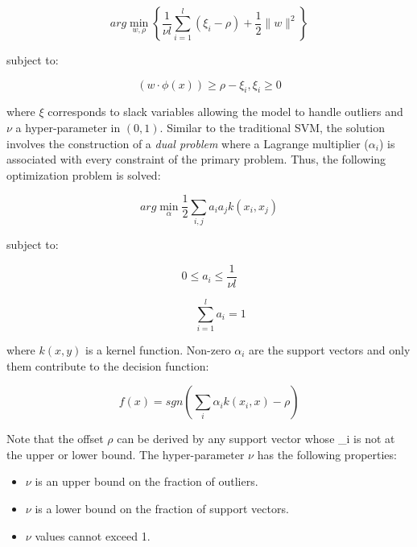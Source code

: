 \begin{equation}\label{chap:openset:sec:eq:3}
	arg\min_{w,\rho}\left\{ \frac{1}{\nu l} \sum_{i=1}^{l}(\xi_{i}-\rho)+\frac{1}{2}\|w\|^{2}\right\}
\end{equation}

\nointend subject to:

\begin{equation}
    (w \cdot \phi(x)) \geq \rho - \xi_i, \xi_i \geq 0
\end{equation}

\noindent where $\xi$ corresponds to slack variables allowing the model to handle outliers and $\nu$ a hyper-parameter in $(0,1)$. Similar to the traditional SVM, the solution involves the construction of a \textit{dual problem} where a Lagrange multiplier ($\alpha_i$) is associated with every constraint of the primary problem. Thus, the following optimization problem is solved:

\begin{equation}\label{chap:openset:sec:eq:12}
	arg\min_{\alpha}\frac{1}{2}\sum_{i,j}a_{i}a_{j}k(x_{i},x_{j})
\end{equation}

\nointent subject to:

\begin{equation}\label{chap:openset:sec:eq:4}
	0\leqslant a_{i}\leqslant \frac{1}{\nu l} %
\end{equation}

\begin{equation}\label{chap:openset:sec:eq:5}
	\qquad \sum_{i=1}^{l}a_{i}=1
\end{equation}

\nointend where $k(x,y)$ is a kernel function. Non-zero $\alpha_i$ are the support vectors and only them contribute to the decision function:

\begin{equation}
    f(x) = sgn(\sum_i \alpha_i k(x_i,x) - \rho)
\end{equation}

Note that the offset $\rho$ can be derived by any support vector whose \alpha_i is not at the upper or lower bound. The hyper-parameter $\nu$ has the following properties:

\begin{itemize}
	\item $\nu$ is an upper bound on the fraction of outliers.
	\item $\nu$ is a lower bound on the fraction of support vectors.
	\item $\nu$ values cannot exceed 1.
\end{itemize}


